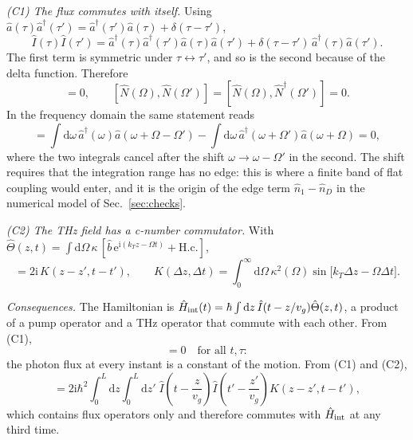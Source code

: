 \documentclass[aps,pra,onecolumn,notitlepage,11pt,amsmath,amssymb,nofootinbib]{revtex4-2}
\newcommand{\Nop}{\hat N}
\newcommand{\Iop}{\hat I}
\newcommand{\dd}{\mathrm{d}}
\newcommand{\ee}{\mathrm{e}}
\newcommand{\ii}{\mathrm{i}}
\begin{document}
\emph{(C1) The flux commutes with itself.} Using
$\hat a(\tau)\hat a^\dagger(\tau')=\hat a^\dagger(\tau')\hat a(\tau)
+\delta(\tau-\tau')$,
\begin{equation}
\Iop(\tau)\Iop(\tau')=\hat a^\dagger(\tau)\hat a^\dagger(\tau')\hat a(\tau)\hat a(\tau')
+\delta(\tau-\tau')\,\hat a^\dagger(\tau)\hat a(\tau').
\end{equation}
The first term is symmetric under $\tau\leftrightarrow\tau'$, and so is the
second because of the delta function. Therefore
\begin{equation}
[\Iop(\tau),\Iop(\tau')]=0,\qquad
[\Nop(\Omega),\Nop(\Omega')]=[\Nop(\Omega),\Nop^\dagger(\Omega')]=0 .
\label{eq:C1}
\end{equation}
In the frequency domain the same statement reads
\begin{equation}
[\Nop(\Omega),\Nop^\dagger(\Omega')]=\int\!\dd\omega\,
\hat a^\dagger(\omega)\hat a(\omega+\Omega-\Omega')
-\int\!\dd\omega\,\hat a^\dagger(\omega+\Omega')\hat a(\omega+\Omega)=0,
\end{equation}
where the two integrals cancel after the shift
$\omega\to\omega-\Omega'$ in the second. The shift requires that the
integration range has no edge: this is where a finite band of flat coupling
would enter, and it is the origin of the edge term
$\hat n_1-\hat n_D$ in the numerical model of Sec.~\ref{sec:checks}.

\emph{(C2) The THz field has a c-number commutator.} With
$\hat\Theta(z,t)=\int\dd\Omega\,\kappa\,[\hat b\,\ee^{\ii(k_Tz-\Omega t)}
+\mathrm{H.c.}]$,
\begin{equation}
[\hat\Theta(z,t),\hat\Theta(z',t')]=2\ii\,K(z-z',t-t'),\qquad
K(\Delta z,\Delta t)=\int_0^\infty\!\!\dd\Omega\,\kappa^2(\Omega)
\sin\!\big[k_T\Delta z-\Omega\Delta t\big].
\label{eq:C2}
\end{equation}

\emph{Consequences.} The Hamiltonian is
$\hat H_{\rm int}(t)=\hbar\int\dd z\,\Iop(t-z/v_g)\hat\Theta(z,t)$, a product
of a pump operator and a THz operator that commute with each other. From (C1),
\begin{equation}
[\hat H_{\rm int}(t),\Iop(\tau)]=0\quad\text{for all }t,\tau:
\end{equation}
the photon flux at every instant is a constant of the motion. From (C1) and
(C2),
\begin{equation}
[\hat H_{\rm int}(t),\hat H_{\rm int}(t')]=2\ii\hbar^2\!\int_0^L\!\!\dd z\!\int_0^L\!\!\dd z'\;
\Iop\!\left(t-\frac{z}{v_g}\right)\Iop\!\left(t'-\frac{z'}{v_g}\right)K(z-z',t-t'),
\label{eq:HH}
\end{equation}
which contains flux operators only and therefore commutes with
$\hat H_{\rm int}$ at any third time.
\end{document}
